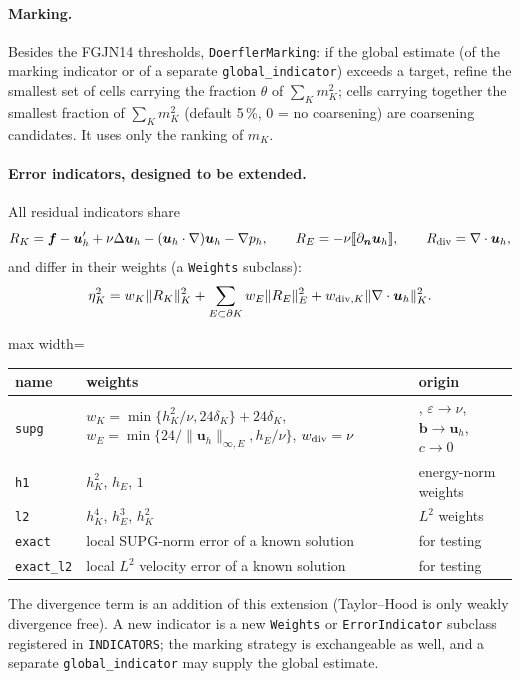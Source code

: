 \documentclass[11pt,a4paper]{article}
\newcommand{\bu}{\boldsymbol{u}}
\newcommand{\bff}{\boldsymbol{f}}
\newcommand{\code}[1]{\texttt{#1}}
\begin{document}
\paragraph{Marking.} Besides the FGJN14 thresholds, \code{DoerflerMarking}: if the global estimate (of the marking
indicator or of a separate \code{global\_indicator}) exceeds a target, refine the smallest set of cells carrying the
fraction $\theta$ of $\sum_K m_K^2$; cells carrying together the smallest fraction of $\sum_Km_K^2$ (default 5\,\%, 0 = no
coarsening) are coarsening candidates. It uses only the ranking of $m_K$.

\paragraph{Error indicators, designed to be extended.} All residual indicators share
\[
R_K=\bff-\bu_h'+\nu\Delta\bu_h-(\bu_h\cdot\nabla)\bu_h-\nabla p_h,\qquad
R_E=-\nu[\![\partial_{\boldsymbol n}\bu_h]\!],\qquad R_{\rm div}=\nabla\cdot\bu_h,
\]
and differ in their weights (a \code{Weights} subclass):
\[
\eta_K^2=w_K\|R_K\|_K^2+\sum_{E\subset\partial K}w_E\|R_E\|_E^2+w_{{\rm div},K}\|\nabla\cdot\bu_h\|_K^2 .
\]
\begin{center}\begin{adjustbox}{max width=\textwidth}
\begin{tabular}{lll}
\toprule
name & weights & origin\\
\midrule
\code{supg} & $w_K=\min\{h_K^2/\nu,24\delta_K\}+24\delta_K$, $w_E=\min\{24/\|\bu_h\|_{\infty,E},h_E/\nu\}$, $w_{\rm div}=\nu$
& \cite[(28)]{FGJN14}, $\varepsilon\to\nu$, $\boldsymbol b\to\bu_h$, $c\to0$\\
\code{h1} & $h_K^2$, $h_E$, $1$ & energy-norm weights\\
\code{l2} & $h_K^4$, $h_E^3$, $h_K^2$ & $L^2$ weights\\
\code{exact} & local SUPG-norm error of a known solution & for testing\\
\code{exact\_l2} & local $L^2$ velocity error of a known solution & for testing\\
\bottomrule
\end{tabular}
\end{adjustbox}\end{center}
The divergence term is an addition of this extension (Taylor--Hood is only weakly divergence free). A new indicator is a
new \code{Weights} or \code{ErrorIndicator} subclass registered in \code{INDICATORS}; the marking strategy is exchangeable
as well, and a separate \code{global\_indicator} may supply the global estimate.
\end{document}
